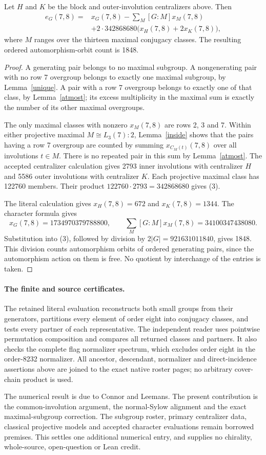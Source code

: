 \documentclass[11pt,a4paper]{article}
\begin{document}
\begin{theorem}
Let $H$ and $K$ be the block and outer-involution centralizers above.
Then
\begin{align*}
 e_G(7,8)={}&x_G(7,8)-\sum_M[G:M]x_M(7,8)\\
 &+2\cdot342868680\bigl(x_H(7,8)+2x_K(7,8)\bigr),             \tag{3}
\end{align*}
where $M$ ranges over the thirteen maximal conjugacy classes.
The resulting ordered automorphism-orbit count is 1848.
\end{theorem}
\begin{proof}
A generating pair belongs to no maximal subgroup. A nongenerating
pair with no row 7 overgroup belongs to exactly one maximal subgroup,
by Lemma~\ref{unique}. A pair with a row 7 overgroup belongs to
exactly one of that class, by Lemma~\ref{atmost}; its excess
multiplicity in the maximal sum is exactly the number of its other
maximal overgroups.

The only maximal classes with nonzero $x_M(7,8)$ are rows 2, 3 and 7.
Within either projective maximal $M\cong L_3(7):2$, Lemma~\ref{inside}
shows that the pairs having a row 7 overgroup are counted by summing
$x_{C_M(t)}(7,8)$ over all involutions $t\in M$. There is no repeated
pair in this sum by Lemma~\ref{atmost}. The accepted centralizer
calculation gives 2793 inner involutions with centralizer $H$ and
5586 outer involutions with centralizer $K$. Each projective maximal
class has 122760 members. Their product
$122760\cdot2793=342868680$ gives (3).

The literal calculation gives $x_H(7,8)=672$ and $x_K(7,8)=1344$.
The character formula gives
\[
x_G(7,8)=1734970379788800,\qquad
\sum_M[G:M]x_M(7,8)=34100347438080.
\]
Substitution into (3), followed by division by $2|G|=921631011840$,
gives 1848. This division counts automorphism orbits of ordered
generating pairs, since the automorphism action on them is free.
No quotient by interchange of the entries is taken.
\end{proof}

\paragraph{The finite and source certificates.}
The retained literal evaluation reconstructs both small groups from
their generators, partitions every element of order eight into
conjugacy classes, and tests every partner of each representative.
The independent reader uses pointwise permutation composition and
compares all returned classes and partners. It also checks the
complete flag normalizer spectrum, which excludes order eight in
the order-8232 normalizer. All ancestor, descendant, normalizer and
direct-incidence assertions above are joined to the exact native
roster pages; no arbitrary cover-chain product is used.

The numerical result is due to Connor and Leemans. The present
contribution is the common-involution argument, the normal-Sylow
alignment and the exact maximal-subgroup correction. The subgroup
roster, primary centralizer data, classical projective models and
accepted character evaluations remain borrowed premises. This
settles one additional numerical entry, and supplies no chirality,
whole-source, open-question or Lean credit.
\end{document}
